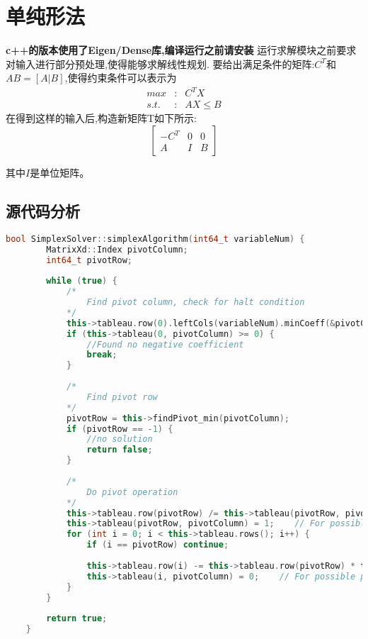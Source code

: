 \section{单纯形法}
\textbf{c++的版本使用了Eigen/Dense库,编译运行之前请安装}
运行求解模块之前要求对输入进行部分预处理,使得能够求解线性规划.
要给出满足条件的矩阵:$C^T$和$AB=[A|B]$,使得约束条件可以表示为
$$
\begin{matrix}
max  &:& C^{T} X \\
s.t. &:& AX \le B
\end{matrix}
$$
在得到这样的输入后,构造新矩阵T如下所示:
$$
\left[
\begin{matrix}
	-C^{T} & 0 & 0 \\
	A & I & B
\end{matrix}
\right]
$$

其中$I$是单位矩阵。

\subsection{源代码分析}

\begin{lstlisting}[language=C++]
    bool SimplexSolver::simplexAlgorithm(int64_t variableNum) {
        MatrixXd::Index pivotColumn;
        int64_t pivotRow;
        
        while (true) {
            /*
                Find pivot column, check for halt condition
            */
            this->tableau.row(0).leftCols(variableNum).minCoeff(&pivotColumn);
            if (this->tableau(0, pivotColumn) >= 0) {
                //Found no negative coefficient
                break;
            }
            
            /*
                Find pivot row
            */
            pivotRow = this->findPivot_min(pivotColumn);
            if (pivotRow == -1) {
                //no solution
                return false;
            }
            
            /*
                Do pivot operation
            */
            this->tableau.row(pivotRow) /= this->tableau(pivotRow, pivotColumn);
            this->tableau(pivotRow, pivotColumn) = 1;    // For possible precision issues
            for (int i = 0; i < this->tableau.rows(); i++) {
                if (i == pivotRow) continue;
                
                this->tableau.row(i) -= this->tableau.row(pivotRow) * this->tableau(i, pivotColumn);
                this->tableau(i, pivotColumn) = 0;    // For possible precision issues
            }
        }
    
        return true;
    }
\end{lstlisting}


